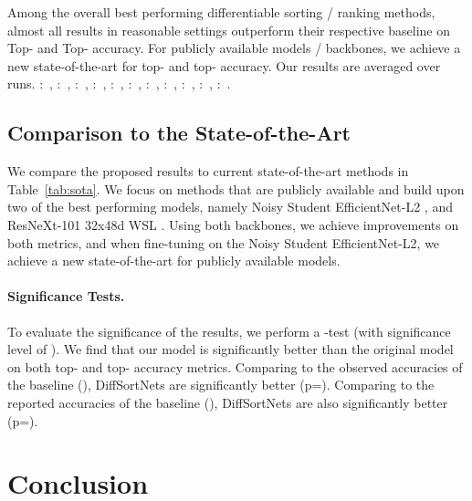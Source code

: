 \documentclass{article}
\begin{document}
\begin{table}[t]
\begin{table}[t]
{        Among the overall best performing differentiable sorting / ranking methods, almost all results in reasonable settings outperform their respective baseline on Top- and Top- accuracy.
        For publicly available models / backbones, we achieve a new state-of-the-art for top- and top- accuracy. Our results are averaged over  runs.
        :~\citet{he2016deep_resnet}, 
        :~\citet{mahajan2018exploring}, 
        :~\citet{dosovitskiy2021image}, 
        :~\citet{xie2020self}, 
        :~\citet{kolesnikov2020big}, 
        :~\citet{radford2021learning}, 
        :~\citet{dosovitskiy2021image}, 
        :~\citet{jia2021scaling}, 
        :~\citet{pham2021meta}, 
        :~\citet{zhai2021scaling}, 
        :~\citet{dai2021coatnet}.
    }
    \label{tab:sota}
\end{table}



\subsection{Comparison to the State-of-the-Art}


We compare the proposed results to current state-of-the-art methods in Table~\ref{tab:sota}. 
We focus on methods that are publicly available and build upon two of the best performing models, namely Noisy Student EfficientNet-L2 \citep{xie2020self}, and ResNeXt-101 32x48d WSL \citep{mahajan2018exploring}.
Using both backbones, we achieve improvements on both metrics, and when fine-tuning on the Noisy Student EfficientNet-L2, we achieve a new state-of-the-art for publicly available models.


\paragraph{Significance Tests.} To evaluate the significance of the results, we perform a -test (with significance level of ).
We find that our model is significantly better than the original model on both top- and top- accuracy metrics. 
Comparing to the observed accuracies of the baseline (), DiffSortNets are significantly better (p=). 
Comparing to the reported accuracies of the baseline (), DiffSortNets are also significantly better (p=).













\section{Conclusion}


\end{table}
\end{document}
